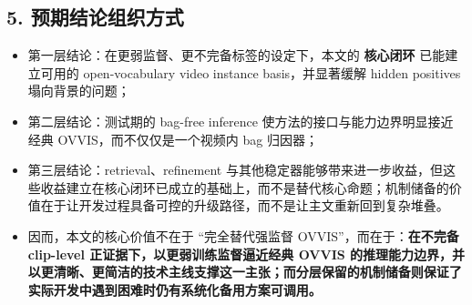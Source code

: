 \documentclass[UTF8]{ctexart}
\begin{document}
\subsection*{5. 预期结论组织方式}
\begin{itemize}
\item 第一层结论：在更弱监督、更不完备标签的设定下，本文的 \textbf{核心闭环} 已能建立可用的 open-vocabulary video instance basis，并显著缓解 hidden positives 塌向背景的问题；
\item 第二层结论：测试期的 bag-free inference 使方法的接口与能力边界明显接近经典 OVVIS，而不仅仅是一个视频内 bag 归因器；
\item 第三层结论：retrieval、refinement 与其他稳定器能够带来进一步收益，但这些收益建立在核心闭环已成立的基础上，而不是替代核心命题；机制储备的价值在于让开发过程具备可控的升级路径，而不是让主文重新回到复杂堆叠。
\item 因而，本文的核心价值不在于 ``完全替代强监督 OVVIS''，而在于：\textbf{在不完备 clip-level 正证据下，以更弱训练监督逼近经典 OVVIS 的推理能力边界，并以更清晰、更简洁的技术主线支撑这一主张；而分层保留的机制储备则保证了实际开发中遇到困难时仍有系统化备用方案可调用。}
\end{itemize}

\par\noindent\hrulefill\par
\end{document}
